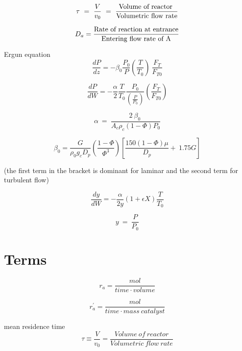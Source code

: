 \documentclass[8pts]{article}
\begin{document}
\[ \ \tau\ =\ \frac{V}{v_{0}} \ = \ \frac{\textnormal{Volume of reactor }}{\textnormal{Volumetric flow rate}}\ \] 
 
\[ \ D_a = \frac{\textnormal{Rate of reaction at entrance}}{ \textnormal{Entering flow rate of A} } \ \] 

Ergun equation 
\[ \frac{dP}{dz}=-\beta_{0}\frac{P_{0}}{P}\left(\frac{T}{T_{0}}\right)\ \frac{F_{T}}{F_{T0}} \]

\[ \frac{dP}{dW}=-\frac{\alpha}{2}\frac{T}{T_{0}}\frac{P_{0}}{\left(\frac{P}{P_{0}}\right)}\left(\frac{F_{T}}{F_{T0}}\right) \]

\[ \alpha\ =\ \frac{2\ \beta_{0}\ }{A_{c}\rho_{c}\left(1-\Phi\right)P_{0}} \]

\[ \beta_{0}=\frac{G}{\rho_{0}g_{c}D_{p}}\left(\frac{1-\Phi}{\Phi^{3}}\right)\left[\frac{150\left(1-\Phi\right)\mu}{D_{p}}+\ 1.75 G\right] \]

(the first term in the bracket is dominant for laminar and the second term for turbulent flow)

\[ \frac{dy}{dW}=-\frac{\alpha}{2y}\left(1+\epsilon X\right)\frac{T}{T_{0}}  \]

\[ y\ =\ \frac{P}{P_{0}} \] 














\clearpage
\section*{Terms}

\[ r_{a} =  \frac{mol}{time \cdot volume}  \label{rate} \tag{p6} \]




\[ r_{a}^{'}=\frac{mol}{time\cdot mass\ catalyst} \tag{p6} \]

mean residence time 
\[ \tau \equiv \frac{V}{v_0}  = \frac{ Volume \ of \ reactor }{ Volumetric \ flow \ rate} \]
\end{document}
